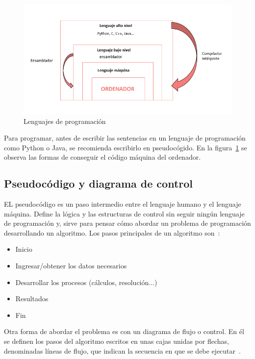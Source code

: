 \documentclass[a4paper, 12pt]{book}
\begin{document}
\begin{figure}[h]
        \centering
        \includegraphics[scale=0.6]{img/lenguajesprograma.png}
        \caption{Lenguajes de programación}
        \label{figura:lenguaje programación}
    \end{figure}


Para programar, antes de escribir las sentencias en un lenguaje de programación como Python o Java, se recomienda escribirlo en pseudocógido. En la figura~\ref{figura:lenguaje programación} se observa las formas de conseguir el código máquina del ordenador.
\subsection{Pseudocódigo y diagrama de control}
EL pseudocódigo es un paso intermedio entre el lenguaje humano y el lenguaje máquina.  Define la lógica y las estructuras de control sin seguir ningún lenguaje de programación y, sirve para pensar cómo abordar un problema de programación desarrollando un algoritmo. Los pasos principales de un algoritmo son~\cite{duque2017algoritmos}:
\begin{itemize}
    \item Inicio
    \item Ingresar/obtener los datos necesarios
    \item Desarrollar los procesos (cálculos, resolución...)
    \item Resultados
    \item Fin
\end{itemize}

Otra forma de abordar el problema es con un diagrama de flujo o control. En él se definen los pasos del algoritmo escritos en unas cajas unidas por flechas, denominadas líneas de flujo, que indican la secuencia en que se debe ejecutar~\cite{albertodiapositivas}. 
\end{document}
